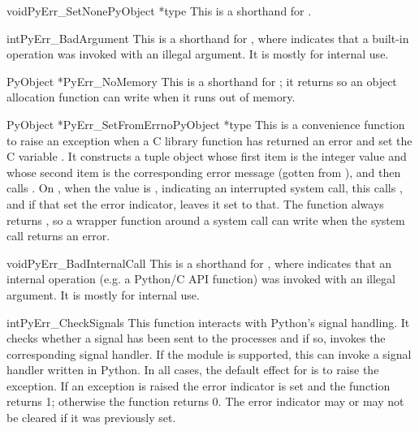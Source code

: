 \begin{cfuncdesc}{void}{PyErr_SetNone}{PyObject *type}
This is a shorthand for .
\end{cfuncdesc}

\begin{cfuncdesc}{int}{PyErr_BadArgument}{}
This is a shorthand for , where  indicates that a built-in operation
was invoked with an illegal argument.  It is mostly for internal use.
\end{cfuncdesc}

\begin{cfuncdesc}{PyObject *}{PyErr_NoMemory}{}
This is a shorthand for ; it
returns \NULL{} so an object allocation function can write
 when  it runs out of memory.
\end{cfuncdesc}

\begin{cfuncdesc}{PyObject *}{PyErr_SetFromErrno}{PyObject *type}
This is a convenience function to raise an exception when a C library
function has returned an error and set the C variable .
It constructs a tuple object whose first item is the integer
 value and whose second item is the corresponding error
message (gotten from ), and then calls
.  On \UNIX{}, when
the  value is , indicating an interrupted
system call, this calls , and if that set
the error indicator, leaves it set to that.  The function always
returns \NULL{}, so a wrapper function around a system call can write 
 when  the system call returns an error.
\end{cfuncdesc}

\begin{cfuncdesc}{void}{PyErr_BadInternalCall}{}
This is a shorthand for , where  indicates that an internal
operation (e.g. a Python/C API function) was invoked with an illegal
argument.  It is mostly for internal use.
\end{cfuncdesc}

\begin{cfuncdesc}{int}{PyErr_CheckSignals}{}
This function interacts with Python's signal handling.  It checks
whether a signal has been sent to the processes and if so, invokes the
corresponding signal handler.  If the  module is
supported, this can invoke a signal handler written in Python.  In all
cases, the default effect for  is to raise the
 exception.  If an exception is raised the
error indicator is set and the function returns 1; otherwise the
function returns 0.  The error indicator may or may not be cleared if
it was previously set.
\end{cfuncdesc}

